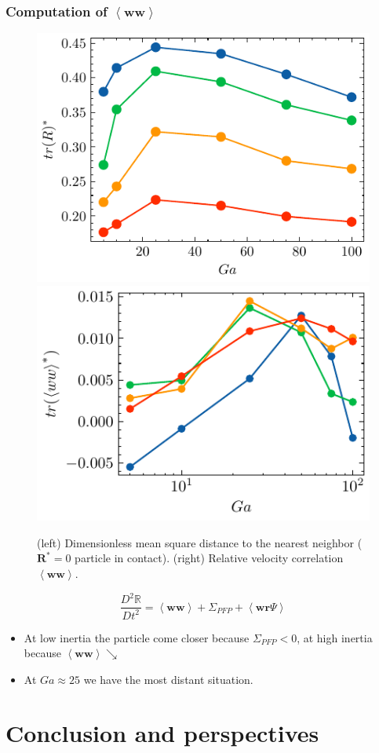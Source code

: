 \documentclass{sintefbeamer}
\newcommand{\avg}[1]{\left<#1\right>}
\newcommand{\condavg}[2]{\overline{#1}^{#2}}
\newcommand{\pddt}{\partial_t}
\begin{document}
\begin{frame}
  \frametitle{Computation of $\avg{\textbf{ww}}$}
  \begin{figure}
    \includegraphics[height=0.23\textwidth]{image/HOMOGENEOUS/fPA/RR.pdf}
    \includegraphics[height=0.23\textwidth]{image/HOMOGENEOUS/fPA/trWW.pdf}
    \caption{ 
      (left) Dimensionless  mean square distance to the nearest neighbor ($\textbf{R}^* =0$ particle in contact). 
      (right) Relative velocity correlation  $\avg{\textbf{ww}}$.
      }
  \end{figure}
  \begin{equation*}
    \frac{D^2 \mathbb{R}}{Dt^2}
  = \avg{\textbf{w}\textbf{w}}
  + \Sigma_{PFP}
  + \avg{\textbf{w}\textbf{r}\Psi}
\end{equation*}
  
  
\begin{itemize}
  \item At low inertia the particle come closer because $\Sigma_{PFP}<0$, at high inertia because $\avg{\textbf{ww}} \searrow$
  \item At $Ga \approx 25$ we have the most distant situation. 
\end{itemize}

\end{frame}




\section{Conclusion and perspectives}
\section*{}
\end{document}
